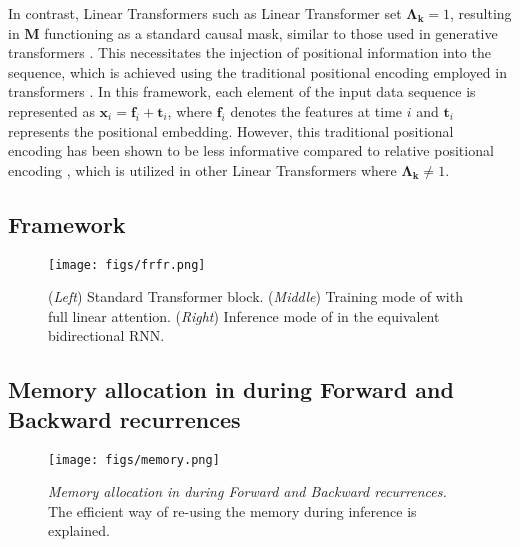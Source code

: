 In contrast, Linear Transformers such as Linear Transformer \citep{trans_rnn} set \(\boldsymbol{\Lambda_k} = 1\), resulting in \(\mathbf{M}\) functioning as a standard causal mask, similar to those used in generative transformers \citep{gpt}. This necessitates the injection of positional information into the sequence, which is achieved using the traditional positional encoding employed in transformers \citep{vaswani_attention_2017}. In this framework, each element of the input data sequence is represented as \(\mathbf{x}_i = \mathbf{f}_i + \mathbf{t}_i\), where \(\mathbf{f}_i\) denotes the features at time \(i\) and \(\mathbf{t}_i\) represents the positional embedding. However, this traditional positional encoding has been shown to be less informative compared to relative positional encoding \citep{roformer}, which is utilized in other Linear Transformers where \(\boldsymbol{\Lambda_k} \neq 1\).



\subsection{\lion Framework}

\begin{figure}[h]
    \centering
    \texttt{[image: figs/frfr.png]}
    \caption{(\textit{Left}) Standard Transformer block. (\textit{Middle}) Training mode of \lion{} with  full linear attention. (\textit{Right}) Inference mode of \lion{} in the equivalent bidirectional RNN. 
    } \vspace{-4mm}
    \label{fig:model}
\end{figure}



\subsection{Memory allocation in \lion during Forward and Backward recurrences} \label{ap:memoryall}
\begin{figure}[h]
    \centering
    \texttt{[image: figs/memory.png]}
  \caption{\textit{Memory allocation in \lion during Forward and Backward recurrences.} The efficient way of re-using the memory during inference is explained. }
    \label{fig:mem}
\end{figure}

